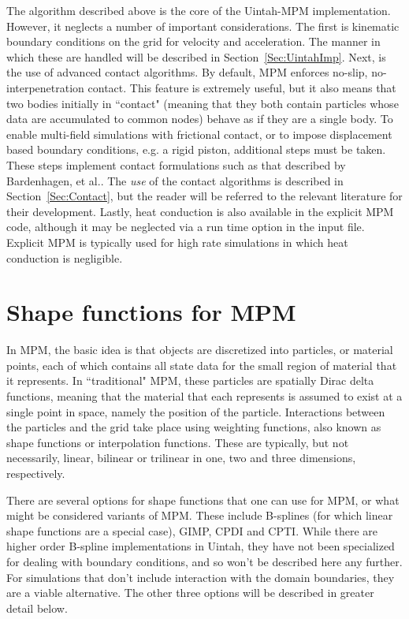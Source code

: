The algorithm described above is the core of the Uintah-MPM implementation.
However, it neglects a number of important considerations.  The first is
kinematic boundary conditions on the grid for velocity and acceleration.
The manner in which these are handled will be described in
Section~\ref{Sec:UintahImp}.  Next, is the use of advanced contact
algorithms.  By default, MPM enforces no-slip, no-interpenetration contact.
This feature is extremely useful, but it also means that two bodies initially
in ``contact" (meaning that they both contain particles whose data are
accumulated to common nodes) behave as if they are a single body.  To enable
multi-field simulations with frictional contact, or to impose displacement
based boundary conditions, e.g. a rigid piston, additional steps must be
taken.  These steps implement contact formulations such as that described
by Bardenhagen, et al.\cite{bard_contact}.  The {\it use} of the contact
algorithms is described in Section~\ref{Sec:Contact}, but the reader will be
referred to the relevant literature for their development.  Lastly, heat
conduction is also available in the explicit MPM code, although it may be
neglected via a run time option in the input file.  Explicit MPM is typically
used for high rate simulations in which heat conduction is negligible.

\section{Shape functions for MPM} \label{gimp_mpm}

In MPM, the basic idea is that objects are discretized into
particles, or material points, each of which contains all state data for the
small region of material that it represents.  In ``traditional" MPM,
these particles are spatially
Dirac delta functions, meaning that the material that each represents is
assumed to exist at a single point in space, namely the position of the
particle.  Interactions between the particles and the grid take place
using weighting functions, also known as shape functions or interpolation
functions.  These are typically, but not necessarily, linear, bilinear or
trilinear in one, two and three dimensions, respectively.

There are several options for shape functions that one can use for MPM,
or what might be considered variants of MPM.  These include B-splines (for
which linear shape functions are a special case), GIMP, CPDI and CPTI.  While
there are higher order B-spline implementations in Uintah, they have not been
specialized for dealing with boundary conditions, and so won't be described
here any further.  For simulations that don't include interaction with the
domain boundaries, they are a viable alternative.  The other three options will
be described in greater detail below.

